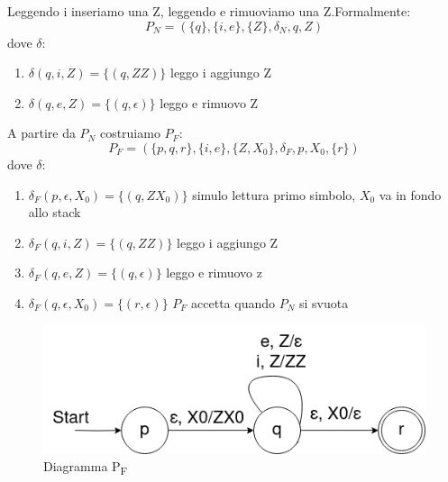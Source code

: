\documentclass[12pt]{article}
\begin{document}
Leggendo i inseriamo una Z, leggendo e rimuoviamo una Z.Formalmente: 
\[ P_N = (\{q\}, \{i,e\}, \{Z\}, \delta_N,q,Z) \]
dove $\delta$: 
\begin{enumerate}
  \item $\delta(q,i,Z) = \{(q,ZZ)\}$ leggo i aggiungo Z 
  \item $\delta(q,e,Z) = \{(q,\epsilon)\}$ leggo e rimuovo Z
\end{enumerate}
A partire da $P_N$ costruiamo $P_F$:
\[ P_F = (\{p,q,r\}, \{i,e\}, \{Z,X_0\}, \delta_F,p,X_0, \{r\}) \]
dove $\delta$:
\begin{enumerate}
  \item $\delta_F(p,\epsilon, X_0) = \{(q,ZX_0)\}$ simulo lettura primo simbolo, $X_0$ va in fondo allo stack
  \item $\delta_F(q, i, Z) = \{(q,ZZ)\}$ leggo i aggiungo Z
  \item $\delta_F(q, e, Z) = \{(q,\epsilon)\}$ leggo e rimuovo z
  \item $\delta_F(q, \epsilon, X_0) = \{(r,\epsilon)\}$ $P_F$ accetta quando $P_N$ si svuota
\end{enumerate}

\begin{figure}[ht]
	\includegraphics[scale = 0.4]{media/if_else_pf.png}
	\centering
  \caption{Diagramma P\textsubscript{F}}
\end{figure}
\end{document}
